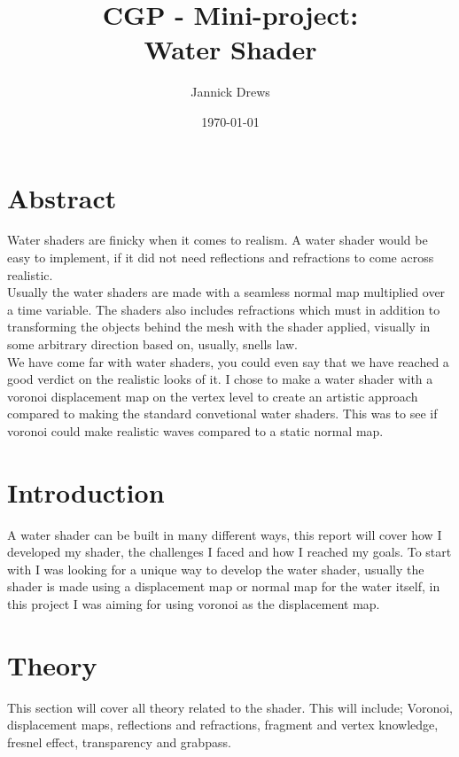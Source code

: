 \documentclass{article}
\title{CGP - Mini-project:\\Water Shader}
\author{Jannick Drews}
\date{\today}
\begin{document}
\maketitle
\newpage
{}


\section{Abstract}
\label{sec:abstract}
Water shaders are finicky when it comes to realism. A water shader would be easy to implement, if it did not need reflections and refractions to come across realistic.\\
Usually the water shaders are made with a seamless normal map multiplied over a time variable. The shaders also includes refractions which must in addition to transforming the objects behind the mesh with the shader applied, visually in some arbitrary direction based on, usually, snells law.\\
We have come far with water shaders, you could even say that we have reached a good verdict on the realistic looks of it.
I chose to make a water shader with a voronoi displacement map on the vertex level to create an artistic approach compared to making the standard convetional water shaders. This was to see if voronoi could make realistic waves compared to a static normal map.

\section{Introduction}
\label{sec:introduction}
A water shader can be built in many different ways, this report will cover how I developed my shader, the challenges I faced and how I reached my goals. To start with I was looking for a unique way to develop the water shader, usually the shader is made using a displacement map or normal map for the water itself, in this project I was aiming for using voronoi as the displacement map.

\section{Theory}
\label{sec:theory}
This section will cover all theory related to the shader. This will include; Voronoi, displacement maps, reflections and refractions, fragment and vertex knowledge, fresnel effect, transparency and grabpass.
\end{document}
